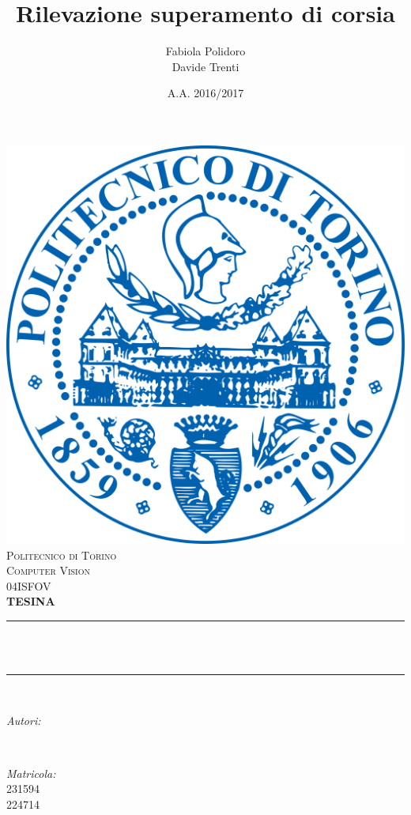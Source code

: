 \documentclass[12pt]{article}
\title{Rilevazione superamento di corsia}				%
\author{Fabiola Polidoro \\ Davide Trenti}			%
\date{A.A. 2016/2017}											%
\makeatletter
\let\thetitle\@title
\let\theauthor\@author
\makeatother
\begin{document}

\begin{titlepage}
	\centering
    \includegraphics[scale = 0.15]{polito.png}\\[1.0 cm]	%
    \textsc{\LARGE Politecnico di Torino}\\[1.5 cm]	%
	\textsc{\Large Computer Vision}\\[0.1 cm]		%
	\textsc{\large 04ISFOV}\\[0.7 cm]				%
    \textsc{\large \bf TESINA}\\
	\rule{\linewidth}{0.2 mm} \\[0.4 cm]
	{ \huge \bfseries \thetitle}\\
	\rule{\linewidth}{0.2 mm} \\[1.5 cm]
	
	\begin{minipage}{0.4\textwidth}
		\begin{flushleft} \large
			\emph{Autori:}\\
			\theauthor
			\end{flushleft}
			\end{minipage}~
			\begin{minipage}{0.4\textwidth}
			\begin{flushright} \large
			\emph{Matricola:} \\
			231594 \\ 224714
		\end{flushright}
	\end{minipage}\\[1.0 cm]
	

\end{titlepage}
\end{document}
